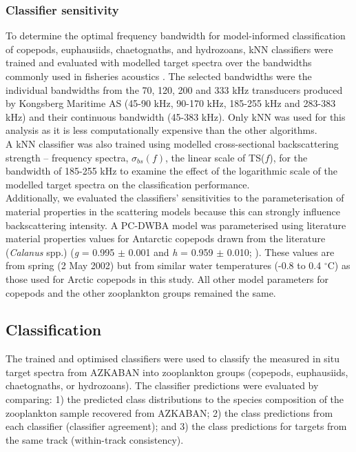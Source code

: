 \subsubsection{Classifier sensitivity}
To determine the optimal frequency bandwidth for model-informed classification of copepods, euphausiids, chaetognaths, and hydrozoans, kNN classifiers were trained and evaluated with modelled target spectra over the bandwidths commonly used in fisheries acoustics \citep{Simmonds2008}. The selected bandwidths were the individual bandwidths from the 70, 120, 200 and 333 kHz transducers produced by Kongsberg Maritime AS (45-90 kHz, 90-170 kHz, 185-255 kHz and 283-383 kHz) and their continuous bandwidth (45-383 kHz). Only kNN was used for this analysis as it is less computationally expensive than the other algorithms.\\
A kNN classifier was also trained using modelled cross-sectional backscattering strength – frequency spectra, $\sigma_{bs}(f)$, the linear scale of TS($f$), for the bandwidth of 185-255 kHz to examine the effect of the logarithmic scale of the modelled target spectra on the classification performance.\\
Additionally, we evaluated the classifiers' sensitivities to the parameterisation of material properties in the scattering models because this can strongly influence backscattering intensity\citep{Chu1999, Sakinan2019}. A PC-DWBA model was parameterised using literature material properties values for Antarctic copepods drawn from the literature (\textit{Calanus} spp.) (\textit{g} = 0.995 $\pm$ 0.001 and \textit{h} = 0.959 $\pm$ 0.010; \citealt{Chu2005}). These values are from spring (2 May 2002) but from similar water temperatures (-0.8 to 0.4 $^{\circ}$C) as those used for Arctic copepods in this study. All other model parameters for copepods and the other zooplankton groups remained the same. \\

\subsection{Classification}
The trained and optimised classifiers were used to classify the measured in situ target spectra from AZKABAN into zooplankton groups (copepods, euphausiids, chaetognaths, or hydrozoans). The classifier predictions were evaluated by comparing: 1) the predicted class distributions to the species composition of the zooplankton sample recovered from AZKABAN; 2) the class predictions from each classifier (classifier agreement); and 3) the class predictions for targets from the same track (within-track consistency). 

